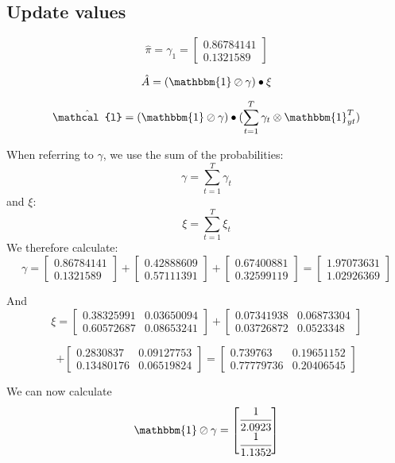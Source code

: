 \subsection{Update values}
\[
\hat{\pi} = \gamma_1 = \begin{bmatrix}
    0.86784141 \\ 0.1321589
\end{bmatrix}
\]

\[
\hat{A} = (\mathbbm{1} \oslash \gamma) \bullet \xi 
\]

\[
\hat{\mathcal{l}} = (\mathbbm{1} \oslash \gamma) \bullet (\sum_{t=1}^T \gamma_t \otimes \mathbbm{1}_{yt}^T)
\]

When referring to $\gamma$, we use the sum of the probabilities:
\[
\gamma = \sum_{t=1}^T \gamma_t
\]
and $\xi$:
\[
\xi = \sum_{t=1}^T \xi_t
\]
We therefore calculate:
\[
\gamma = \begin{bmatrix}
    0.86784141 \\ 0.1321589
\end{bmatrix}
+ \begin{bmatrix}
    0.42888609  \\ 0.57111391
\end{bmatrix} + \begin{bmatrix}
    0.67400881 \\ 0.32599119
\end{bmatrix} = \begin{bmatrix}
    1.97073631 \\ 1.02926369
\end{bmatrix}
\]

And
\[
\xi = \begin{bmatrix}
    0.38325991 & 0.03650094 \\
    0.60572687 & 0.08653241
\end{bmatrix} + \begin{bmatrix}
    0.07341938 & 0.06873304 \\
 0.03726872 & 0.0523348  
\end{bmatrix}
\]

\[ + \begin{bmatrix}
    0.2830837  & 0.09127753 \\ 
 0.13480176 & 0.06519824
\end{bmatrix} = \begin{bmatrix}
    0.739763   & 0.19651152 \\
    0.77779736 & 0.20406545
\end{bmatrix}
\]

We can now calculate 
\[
\mathbbm{1} \oslash \gamma = \begin{bmatrix}
    \cfrac{1}{2.0923} \\ \cfrac{1}{1.1352}
\end{bmatrix}
\]


